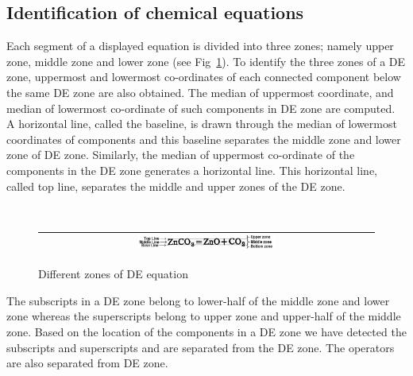 \documentclass[conference]{IEEEtran}
\begin{document}
\subsection{Identification of chemical equations}
Each segment of a displayed equation is divided into three zones; namely upper zone, middle zone and lower zone (see Fig~\ref{sub_super}).
To identify the three zones of a DE zone, uppermost and lowermost co-ordinates of each connected component below the same DE zone  are also obtained.
The median of uppermost coordinate, and median of lowermost co-ordinate of such components in DE zone are computed.
A horizontal line, called the baseline, is drawn through the median of lowermost coordinates of components
and this baseline separates the middle zone and lower zone of DE zone.
Similarly, the median of uppermost co-ordinate of the components in the DE zone  generates a horizontal line. This horizontal line, called top line, separates the middle and  upper zones of the DE zone.

\begin{figure}[h]\center\
\begin{tabular}{|c|}
\hline
 \includegraphics[width=0.42\textwidth]{supSub.png} \\ \hline
 \end{tabular} 
 \caption{Different zones of DE equation}
 \label{sub_super}
\end{figure}
The subscripts in a DE zone belong to lower-half of the middle zone and lower zone whereas the superscripts belong to upper zone and
upper-half of the middle zone. Based on the location of the components in a DE zone we have detected the subscripts and superscripts
and are separated from the DE zone. The operators are also separated from DE zone.
 
\end{document}
